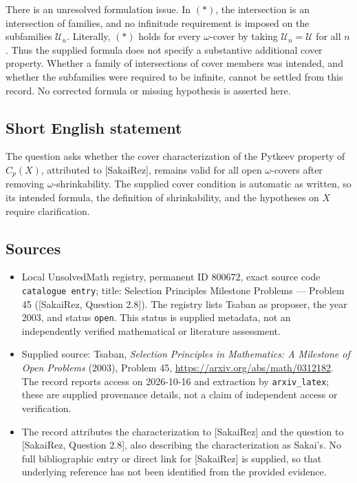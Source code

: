 \documentclass[11pt]{article}
\begin{document}
There is an unresolved formulation issue. In \((*)\), the intersection is an intersection of families, and no infinitude requirement is imposed on the subfamilies \(\mathcal U_n\). Literally, \((*)\) holds for every \(\omega\)-cover by taking \(\mathcal U_n=\mathcal U\) for all \(n\). Thus the supplied formula does not specify a substantive additional cover property. Whether a family of intersections of cover members was intended, and whether the subfamilies were required to be infinite, cannot be settled from this record. No corrected formula or missing hypothesis is asserted here.
\subsection{Short English statement}
The question asks whether the cover characterization of the Pytkeev property of \(C_p(X)\), attributed to [SakaiRez], remains valid for all open \(\omega\)-covers after removing \(\omega\)-shrinkability. The supplied cover condition is automatic as written, so its intended formula, the definition of shrinkability, and the hypotheses on \(X\) require clarification.
\subsection{Sources}
\begin{itemize}
\item Local UnsolvedMath registry, permanent ID \(800672\), exact source code \texttt{catalogue entry}; title: Selection Principles Milestone Problems --- Problem 45 ([SakaiRez, Question 2.8]). The registry lists Tsaban as proposer, the year 2003, and status \texttt{open}. This status is supplied metadata, not an independently verified mathematical or literature assessment.
\item Supplied source: Tsaban, \emph{Selection Principles in Mathematics: A Milestone of Open Problems} (2003), Problem 45, \url{https://arxiv.org/abs/math/0312182}. The record reports access on 2026-10-16 and extraction by \texttt{arxiv\_latex}; these are supplied provenance details, not a claim of independent access or verification.
\item The record attributes the characterization to [SakaiRez] and the question to [SakaiRez, Question 2.8], also describing the characterization as Sakai's. No full bibliographic entry or direct link for [SakaiRez] is supplied, so that underlying reference has not been identified from the provided evidence.
\end{itemize}
\end{document}

